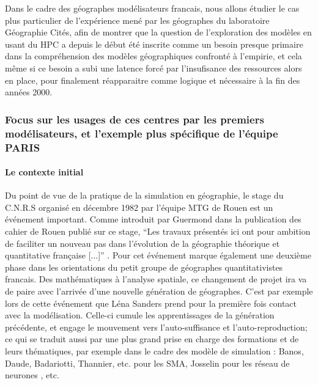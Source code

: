 Dans le cadre des géographes modélisateurs francais, nous allons étudier le cas plus particulier de l'expérience mené par les géographes du laboratoire Géographie Cités, afin de montrer que la question de l'exploration des modèles en usant du HPC a depuis le début été inscrite comme un besoin presque primaire dans la compréhension des modèles géographiques confronté à l'empirie, et cela même si ce besoin a subi une latence forcé par l'insufisance des ressources alors en place, pour finalement réapparaitre comme logique et nécessaire à la fin des années 2000.




\subsubsection{Focus sur les usages de ces centres par les premiers modélisateurs, et l'exemple plus spécifique de l'équipe PARIS}
\label{sssec:contexte_modelisateur}

\paragraph{Le contexte initial}

Du point de vue de la pratique de la simulation en géographie, le stage du C.N.R.S organisé en décembre 1982 par l'équipe MTG de Rouen est un événement important. Comme introduit par Guermond dans la publication des cahier de Rouen publié sur ce stage, \enquote{Les travaux présentés ici ont pour ambition de faciliter un nouveau pas dans l'évolution de la géographie théorique et quantitative française [...]} \autocite{Guermond1983}. Pour \autocite[320-321]{Cuyala2014} cet événement marque également une deuxième phase dans les orientations du petit groupe de géographes quantitativistes francais. Des mathématiques à l'analyse spatiale, ce changement de projet ira va de paire avec l'arrivée d'une nouvelle génération de géographes. C'est par exemple lors de cette événement que Léna Sanders prend pour la première fois contact avec la modélisation. Celle-ci cumule les apprentissages de la génération précédente, et engage le mouvement vers l'auto-suffisance et l'auto-reproduction; ce qui se traduit aussi par une plus grand prise en charge des formations et de leurs thématiques, par exemple dans le cadre des modèle de simulation : Banos, Daude, Badariotti, Thannier, etc. pour les SMA, Josselin pour les réseau de neurones \autocite{Dumolard1994}, etc.

